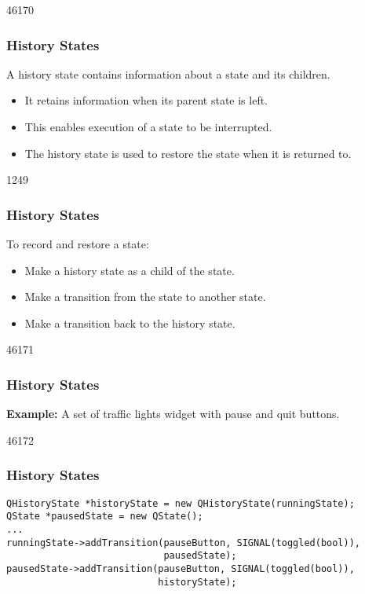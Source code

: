 \begin{slide}{46170}\frametitle{History States}
\vfill
A history state contains information about a state and its children.

\begin{itemize}
\item It retains information when its parent state is left.
\item This enables execution of a state to be interrupted.
\item The history state is used to restore the state when it is returned to.
\end{itemize}
\end{slide}

\begin{slide}{1249}\frametitle{History States}
\vfill
To record and restore a state:

\begin{itemize}
\item Make a history state as a child of the state.
\item Make a transition from the state to another state.
\item Make a transition back to the history state.
\end{itemize}
\end{slide}

\begin{slide}{46171}\frametitle{History States}
\textbf{Example:} A set of traffic lights widget with pause and quit buttons.

\vspace*{0.5em}
\vfill
\end{slide}

\begin{slide}[fragile]{46172}\frametitle{History States}
\vspace*{-0.5em}
\vspace*{-1.0em}
\small
\begin{lstlisting}
QHistoryState *historyState = new QHistoryState(runningState);
QState *pausedState = new QState();
...
runningState->addTransition(pauseButton, SIGNAL(toggled(bool)),
                            pausedState);
pausedState->addTransition(pauseButton, SIGNAL(toggled(bool)),
                           historyState);
\end{lstlisting}
\normalsize
\smallskip
{}
\end{slide}

